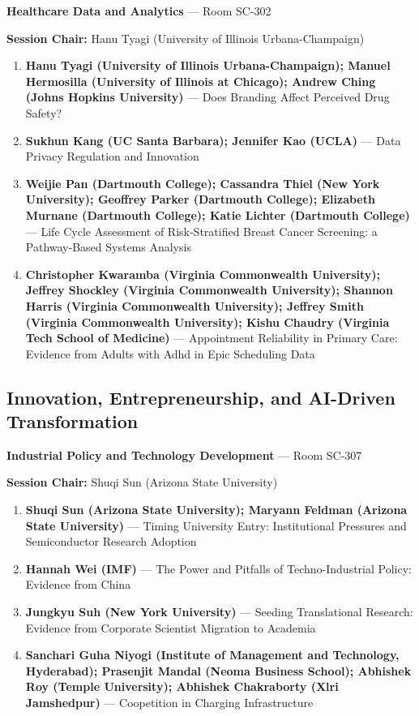 \documentclass[
  10pt,
  letterpaper,
  DIV=11,
  numbers=noendperiod]{scrartcl}
\begin{document}
\textbf{Healthcare Data and Analytics} --- Room SC-302

\textbf{Session Chair:} Hanu Tyagi (University of Illinois
Urbana-Champaign)

\begin{enumerate}
\def\labelenumi{\arabic{enumi}.}
\item
  \textbf{Hanu Tyagi (University of Illinois Urbana-Champaign); Manuel
  Hermosilla (University of Illinois at Chicago); Andrew Ching (Johns
  Hopkins University)} --- Does Branding Affect Perceived Drug Safety?
\item
  \textbf{Sukhun Kang (UC Santa Barbara); Jennifer Kao (UCLA)} --- Data
  Privacy Regulation and Innovation
\item
  \textbf{Weijie Pan (Dartmouth College); Cassandra Thiel (New York
  University); Geoffrey Parker (Dartmouth College); Elizabeth Murnane
  (Dartmouth College); Katie Lichter (Dartmouth College)} --- Life Cycle
  Assessment of Risk‑Stratified Breast Cancer Screening: a Pathway‑Based
  Systems Analysis
\item
  \textbf{Christopher Kwaramba (Virginia Commonwealth University);
  Jeffrey Shockley (Virginia Commonwealth University); Shannon Harris
  (Virginia Commonwealth University); Jeffrey Smith (Virginia
  Commonwealth University); Kishu Chaudry (Virginia Tech School of
  Medicine)} --- Appointment Reliability in Primary Care: Evidence from
  Adults with Adhd in Epic Scheduling Data
\end{enumerate}

\subsection{\texorpdfstring{\textcolor{innovation}{Innovation, Entrepreneurship, and AI-Driven Transformation}}{}}\label{section-42}

\textbf{Industrial Policy and Technology Development} --- Room SC-307

\textbf{Session Chair:} Shuqi Sun (Arizona State University)

\begin{enumerate}
\def\labelenumi{\arabic{enumi}.}
\item
  \textbf{Shuqi Sun (Arizona State University); Maryann Feldman (Arizona
  State University)} --- Timing University Entry: Institutional
  Pressures and Semiconductor Research Adoption
\item
  \textbf{Hannah Wei (IMF)} --- The Power and Pitfalls of
  Techno-Industrial Policy: Evidence from China
\item
  \textbf{Jungkyu Suh (New York University)} --- Seeding Translational
  Research: Evidence from Corporate Scientist Migration to Academia
\item
  \textbf{Sanchari Guha Niyogi (Institute of Management and Technology,
  Hyderabad); Prasenjit Mandal (Neoma Business School); Abhishek Roy
  (Temple University); Abhishek Chakraborty (Xlri Jamshedpur)} ---
  Coopetition in Charging Infrastructure
\end{enumerate}
\end{document}
